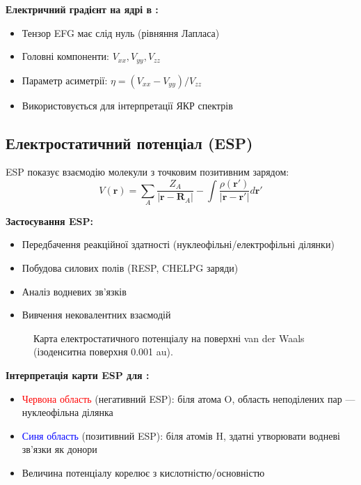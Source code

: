 
\textbf{Електричний градієнт на ядрі  в :}
\begin{itemize}
    \item Тензор EFG має слід нуль (рівняння Лапласа)
    \item Головні компоненти: $V_{xx}, V_{yy}, V_{zz}$
    \item Параметр асиметрії: $\eta = (V_{xx} - V_{yy})/V_{zz}$
    \item Використовується для інтерпретації ЯКР спектрів
\end{itemize}

\subsection{Електростатичний потенціал (ESP)}

ESP показує взаємодію молекули з точковим позитивним зарядом:
\[
V(\mathbf{r}) = \sum_A \frac{Z_A}{|\mathbf{r} - \mathbf{R}_A|} -
\int \frac{\rho(\mathbf{r}')}{|\mathbf{r} - \mathbf{r}'|} d\mathbf{r}'
\]

\textbf{Застосування ESP:}
\begin{itemize}
    \item Передбачення реакційної здатності (нуклеофільні/електрофільні ділянки)
    \item Побудова силових полів (RESP, CHELPG заряди)
    \item Аналіз водневих зв'язків
    \item Вивчення нековалентних взаємодій
\end{itemize}


\begin{figure}[h!]\centering
\caption{Карта електростатичного потенціалу  на поверхні
van der Waals (ізоденситна поверхня 0.001 au).}
\label{pic:h2o_esp}
\end{figure}

\textbf{Інтерпретація карти ESP для :}
\begin{itemize}
    \item \textcolor{red}{Червона область} (негативний ESP): біля атома O,
          область неподілених пар --- нуклеофільна ділянка
    \item \textcolor{blue}{Синя область} (позитивний ESP): біля атомів H,
          здатні утворювати водневі зв'язки як донори
    \item Величина потенціалу корелює з кислотністю/основністю
\end{itemize}

